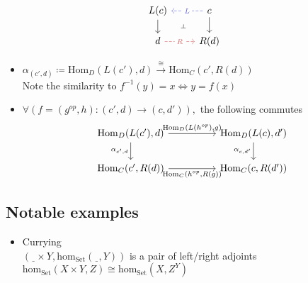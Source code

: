 \[\begin{tikzcd}[row sep=scriptsize]
	{L(c)} & c \\
	d & {R(d)}
	\arrow[from=1-2, to=2-2]
	\arrow[from=1-1, to=2-1]
	\arrow[""{name=0, anchor=center, inner sep=0}, "L"{description}, color={rgb,255:red,92;green,92;blue,214}, dashed, from=1-2, to=1-1]
	\arrow[""{name=1, anchor=center, inner sep=0}, "R"{description}, color={rgb,255:red,214;green,92;blue,92}, dashed, from=2-1, to=2-2]
	\arrow["\dashv"{anchor=center, rotate=-93}, draw=none, from=0, to=1]
\end{tikzcd}\]

\begin{itemize}
  \item $\alpha_{(c', d)} \coloneqq \mathrm{Hom}_D(L(c'), d)
    \overset{\cong}{\to} \mathrm{Hom}_C(c', R(d))$\\
    Note the similarity to $f^{-1}(y)=x \iff y=f(x)$
  \item $\forall (f = (g^{op}, h): (c', d) \to (c, d')),$
    the following commutes
    \[\begin{tikzcd}
      {\mathrm{Hom}_D(L(c'), d)} && {\mathrm{Hom}_D(L(c),d')} \\
      {\mathrm{Hom}_C(c', R(d))} && {\mathrm{Hom}_C(c,R(d'))}
      \arrow["{\alpha_{c',d}}"', from=1-1, to=2-1]
      \arrow["{\alpha_{c,d'}}"', from=1-3, to=2-3]
      \arrow["{\mathrm{Hom}_D(L(h^{op}), g)}", from=1-1, to=1-3]
      \arrow["{\mathrm{Hom}_C(h^{op}, R(g))}"', from=2-1, to=2-3]
    \end{tikzcd}\]
\end{itemize}

\subsection{Notable examples}
\begin{itemize}
  \item Currying \parencite{fong:7sketches}\\
    $(\underline{\ \ } \times Y, \mathrm{hom}_{\mathrm{Set}}(\underline{\ \ }, Y))$
    is a pair of left/right adjoints\\
    $\mathrm{hom}_{\mathrm{Set}}(X\times Y, Z) \cong \mathrm{hom}_{\mathrm{Set}}
      (X, Z^Y)$
\end{itemize}